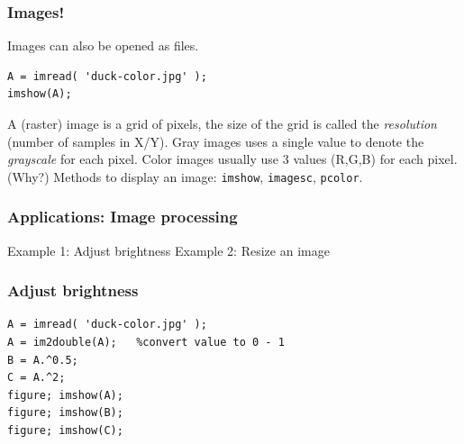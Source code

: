 \documentclass[11pt]{beamer}
\begin{document}
\begin{frame}[fragile]
  \frametitle{Images!}
  \Enlarge

  \begin{enumerate}
  \myitem  Images can also be opened as files.
  \end{enumerate}
  \begin{Verbatim}
A = imread( 'duck-color.jpg' );
imshow(A);
  \end{Verbatim}
  \pause
  \begin{enumerate}
  \myitem  A (raster) image is a grid of pixels, the size of the grid is called the \emph{resolution} (number of samples in X/Y).
  \myitem  Gray images uses a single value to denote the \emph{grayscale} for each pixel.
  \myitem  Color images usually use 3 values (R,G,B) for each pixel.  (Why?) \pause
  \myitem  Methods to display an image: \texttt{imshow}, \texttt{imagesc}, \texttt{pcolor}.
  \end{enumerate}
\end{frame}


\begin{frame}[fragile]
  \frametitle{Applications: Image processing}
  \Enlarge

  \begin{enumerate}
  \myitem  Example 1: Adjust brightness
  \myitem  Example 2: Resize an image
  \end{enumerate}

\end{frame}

\begin{frame}[fragile]
  \frametitle{Adjust brightness}
  \Enlarge

  \begin{Verbatim}
A = imread( 'duck-color.jpg' );
A = im2double(A);   %convert value to 0 - 1
B = A.^0.5;
C = A.^2;
figure; imshow(A); 
figure; imshow(B); 
figure; imshow(C);
  \end{Verbatim}

\end{frame}
\end{document}
